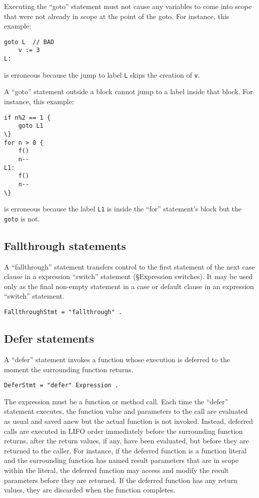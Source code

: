 Executing the ``goto'' statement must not cause any variables to come
into scope that were not already in
scope at the point of the goto. For instance, this example:

\begin{Verbatim}[frame=single]
    goto L  // BAD
    v := 3
L:
\end{Verbatim}

is erroneous because the jump to label \texttt{L} skips the creation of
\texttt{v}.

A ``goto'' statement outside a block cannot jump to a
label inside that block. For instance, this example:

\begin{Verbatim}[frame=single]
if n%2 == 1 {
    goto L1
\}
for n > 0 {
    f()
    n--
L1:
    f()
    n--
\}
\end{Verbatim}

is erroneous because the label \texttt{L1} is inside the ``for''
statement's block but the \texttt{goto} is not.

\subsection*{Fallthrough statements}

A ``fallthrough'' statement transfers control to the first statement of
the next case clause in a expression ``switch'' statement
(§Expression switches). It may be used
only as the final non-empty statement in a case or default clause in an
expression ``switch'' statement.

\begin{Verbatim}[frame=single]
FallthroughStmt = "fallthrough" .
\end{Verbatim}

\subsection*{Defer statements}

A ``defer'' statement invokes a function whose execution is deferred to
the moment the surrounding function returns.

\begin{Verbatim}[frame=single]
DeferStmt = "defer" Expression .
\end{Verbatim}

The expression must be a function or method call. Each time the
``defer'' statement executes, the function value and parameters to the
call are evaluated as usual and saved anew but the
actual function is not invoked. Instead, deferred calls are executed in
LIFO order immediately before the surrounding function returns, after
the return values, if any, have been evaluated, but before they are
returned to the caller. For instance, if the deferred function is a
function literal and the surrounding
function has named result parameters that
are in scope within the literal, the deferred function may access and
modify the result parameters before they are returned. If the deferred
function has any return values, they are discarded when the function
completes.

